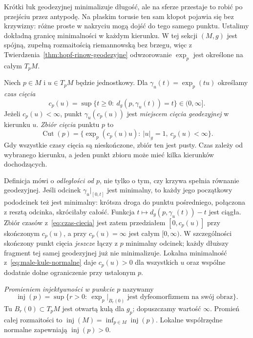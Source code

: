 Krótki łuk geodezyjnej minimalizuje długość, ale
na sferze przestaje to robić po przejściu przez antypodę.
Na płaskim torusie ten sam kłopot pojawia się bez krzywizny:
różne proste w nakryciu mogą dojść do tego samego punktu.
Ustalimy dokładną granicę minimalności w każdym kierunku.
W tej sekcji $(M,g)$ jest spójną, zupełną rozmaitością
riemannowską bez brzegu, więc z Twierdzenia~\ref{thm:hopf-rinow-geodezyjne}
odwzorowanie $\exp_p$ jest określone na całym $T_pM$.

\begin{definicja}
\label{def:czas-miejsce-ciecia}
Niech $p\in M$ i $u\in T_pM$ będzie jednostkowy.
Dla $\gamma_u(t)=\exp_p(tu)$ określamy \emph{czas cięcia}
\begin{equation}\label{eq:czas-ciecia}
 c_p(u)=\sup\{t\geq0:\ d_g(p,\gamma_u(t))=t\}
       \in(0,\infty].
\end{equation}
Jeżeli $c_p(u)<\infty$, punkt
$\gamma_u(c_p(u))$ jest \emph{miejscem cięcia geodezyjnej}
w kierunku $u$. \emph{Zbiór cięcia} punktu $p$ to
\[
 \operatorname{Cut}(p)
 =\{\exp_p(c_p(u)u):\ |u|_g=1,\ c_p(u)<\infty\}.
\]
Gdy wszystkie czasy cięcia są nieskończone, zbiór ten
jest pusty. Czas zależy od wybranego kierunku, a jeden
punkt zbioru może mieć kilka kierunków dochodzących.
\end{definicja}

Definicja mówi o \emph{odległości od $p$}, nie tylko
o tym, czy krzywa spełnia równanie geodezyjnej.
Jeśli odcinek $\gamma_u|_{[0,t]}$ jest minimalny,
to każdy jego początkowy pododcinek też jest minimalny:
krótsza droga do punktu pośredniego, połączona z resztą
odcinka, skróciłaby całość. Funkcja
$t\mapsto d_g(p,\gamma_u(t))-t$ jest ciągła.
Zbiór czasów z~\eqref{eq:czas-ciecia} jest zatem
przedziałem $[0,c_p(u)]$ przy skończonym $c_p(u)$,
a przy $c_p(u)=\infty$ jest całym $[0,\infty)$.
W szczególności skończony punkt cięcia \emph{jeszcze}
łączy z $p$ minimalny odcinek; każdy dłuższy fragment
tej samej geodezyjnej już nie minimalizuje.
Lokalna minimalność z~\eqref{eq:male-kule-normalne}
daje $c_p(u)>0$ dla wszystkich $u$ oraz wspólne
dodatnie dolne ograniczenie przy ustalonym $p$.

\begin{definicja}
\label{def:promien-injektywnosci}
\emph{Promieniem injektywności w punkcie $p$} nazywamy
\[
 \operatorname{inj}(p)=
 \sup\{r>0:\ \exp_p|_{B_r(0)}
       \text{ jest dyfeomorfizmem na swój obraz}\}.
\]
Tu $B_r(0)\subset T_pM$ jest otwartą kulą dla $g_p$;
dopuszczamy wartość $\infty$. Promień całej rozmaitości
to $\operatorname{inj}(M)=\inf_{p\in M}\operatorname{inj}(p)$.
Lokalne współrzędne normalne zapewniają
$\operatorname{inj}(p)>0$.
\end{definicja}

